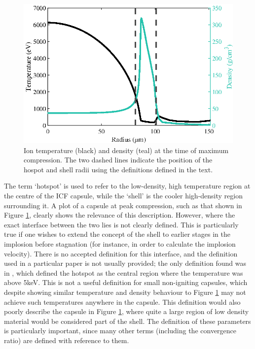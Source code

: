 \begin{figure}[ht]
	\centering
	\includegraphics{figures/LowCR/HSDefn.eps}
	\caption{Ion temperature (black) and density (teal) at the time of maximum compression. The two dashed lines indicate the position of the hospot and shell radii using the definitions defined in the text.}
	\label{fig:HsDefn}
\end{figure}

The term `hotspot' is used to refer to the low-density, high temperature region at the centre of the ICF capsule, while the `shell' is the cooler high-density region surrounding it. A plot of a capsule at peak compression, such as that shown in Figure \ref{fig:HsDefn}, clearly shows the relevance of this description. However, where the exact interface between the two lies is not clearly defined. This is particularly true if one wishes to extend the concept of the shell to earlier stages in the implosion before stagnation (for instance, in order to calculate the implosion velocity). There is no accepted definition for this interface, and the definition used in a particular paper is not usually provided; the only definition found was in \cite{Olson2021}, which defined the hotspot as the central region where the temperature was above 5keV. This is not a useful definition for small non-igniting capsules, which despite showing similar temperature and density behaviour to Figure \ref{fig:HsDefn} may not achieve such temperatures anywhere in the capsule. This definition would also poorly describe the capsule in Figure \ref{fig:HsDefn}, where quite a large region of low density material would be considered part of the shell. The definition of these parameters is particularly important, since many other terms (including the convergence ratio) are defined with reference to them.


